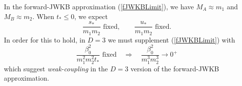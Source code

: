 In the forward-JWKB approximation (\ref{fJWKBLimit}), we have $M_{A} \approx m_{1}$ and $M_{B} \approx m_{2}$. When $t_{*} \leq 0$, we expect
\begin{equation}
	\frac{s_{*}}{m_{1} m_{2}} \text{ fixed}, \qquad \frac{u_{*}}{m_{1} m_{2}} \text{ fixed.}
\end{equation}
In order for this to hold, in $D = 3$ we must supplement (\ref{fJWKBLimit}) with
\begin{equation}
	\frac{\beta_{0}^{2}}{m_{1}^{2} m_{2}^{2} t_{*}} \text{ fixed} \quad \Longrightarrow \quad \frac{\beta_{0}^{2}}{m_{1}^{3} m_{2}^{3}} \rightarrow 0^{+}
\end{equation}
which suggest \textit{weak-coupling} in the $D = 3$ version of the forward-JWKB approximation.
